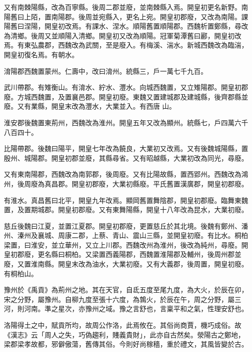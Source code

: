 \begin{pinyinscope}
 又有南棘陽縣，改為百寧縣。後周二郡並廢，並南棘縣入焉。開皇初更名新野。南陽舊曰上陌，置南陽郡。後周並宛縣入，更名上宛。開皇初郡廢，又改為南陽。課陽舊曰涅陽，開皇初改焉。有課水、涅水。順陽舊置順陽郡。西魏析置鄭縣，尋改為清鄉。後周又並順陽入清鄉。開皇初又改為順陽。冠軍菊潭舊曰酈，開皇初改焉。有東弘農郡，西魏改為武關，至是廢入。有梅溪、湍水。新城西魏改為臨湍，開皇初復名焉。有朝水。



 淯陽郡西魏置蒙州。仁壽中，改曰淯州。統縣三，戶一萬七千九百。



 武川帶郡。有雉衡山。有淯水、紵水、灃水。向城西魏置，又立雉陽郡。開皇初郡廢。方城西魏置，及置襄邑郡。開皇初廢。東魏又置建城郡及建城縣，後齊郡縣並廢。又有業縣，開皇末改為灃水，大業並入。有西唐
 山。



 淮安郡後魏置東荊州，西魏改為淮州。開皇五年又改為顯州。統縣七，戶四萬六千八百四十。



 比陽帶郡。後魏曰陽平，開皇七年改為饒良，大業初又改焉。又有後魏城陽縣，置殷州、城陽郡。開皇初郡並廢，其縣尋省。又有昭越縣，大業初改為同光，尋廢。



 又有東南陽郡，西魏改為南郭郡，後周廢。又有比陽故縣，置西郢州。西魏改為鴻州，後周廢為真昌郡。開皇初郡廢，大業初縣廢。平氏舊置漢廣郡，開皇初郡廢。



 有淮水。真昌舊曰北平，開皇九年改焉。顯岡舊置舞陰郡，開皇初郡廢。臨舞東魏置，及置期城郡。開皇初郡廢。又有東舞陽縣，開皇十八年改為昆水，大業初廢。



 慈丘後魏曰江夏，並置江夏郡。開皇初郡廢，更置慈丘於其北境。後魏有鄭州、潘州、溱州及襄城、周康二郡，上蔡、青山、震山三縣，並開皇初廢。有比水。桐柏梁置，曰淮安，並立華州，又立上川郡。西魏改州為淮州，後改為純州，尋廢。開皇初郡廢，更名縣曰桐柏。又梁置西義陽郡，西魏置淮陽郡及輔州，後周州郡並廢，又置淮南縣。開皇末改為油水，大業初廢。又有大義郡，後周置，開皇初廢。有桐柏山。



 豫州於《禹貢》為荊州之地。其在天官，自氐五度至尾九度，為大火，於辰在卯，宋之分野，屬豫州。自柳九度至張十六度，為鶉火，於辰在午，周之分野，屬三河，則河南。準之星次，亦豫州之域。豫之言舒也，言稟平和之氣，性理安舒也。



 洛陽得土之中，賦貢所均，故周公作洛，此焉攸在。其俗尚商賈，機巧成俗。故《漢志》云「周人之失，巧偽趨利，賤義貴財」，此亦自古然矣。滎陽古之鄭地，梁郡梁孝故都，邪僻傲蕩，舊傳其俗。今則好尚稼穡，重於禮文，其風皆變於古。




\end{pinyinscope}
